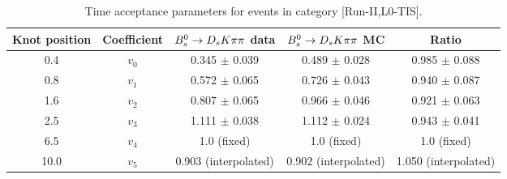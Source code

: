 \begin{table}[hp!]
\centering
\small
\caption{Time acceptance parameters for events in category [\textsf{Run-II},\textsf{L0-TIS}].}
\begin{tabular}{c c c c c}
\hline
\hline
Knot position & Coefficient & ${{B}^0_{s}}\rightarrow{\ensuremath{{D}_{s}}}{\ensuremath{K}}{\ensuremath{\pi}}{\ensuremath{\pi}}$ data & ${{B}^0_{s}}\rightarrow{\ensuremath{{D}_{s}}}{\ensuremath{K}}{\ensuremath{\pi}}{\ensuremath{\pi}}$ MC & Ratio \\
\hline
0.4 & $v_{0}$ & 0.345 $\pm$ 0.039 & 0.489 $\pm$ 0.028 & 0.985 $\pm$ 0.088\\
0.8 & $v_{1}$ & 0.572 $\pm$ 0.065 & 0.726 $\pm$ 0.043 & 0.940 $\pm$ 0.087\\
1.6 & $v_{2}$ & 0.807 $\pm$ 0.065 & 0.966 $\pm$ 0.046 & 0.921 $\pm$ 0.063\\
2.5 & $v_{3}$ & 1.111 $\pm$ 0.038 & 1.112 $\pm$ 0.024 & 0.943 $\pm$ 0.041\\
6.5 & $v_{4}$ &  1.0 (fixed) & 1.0 (fixed) & 1.0 (fixed)\\
10.0 & $v_{5}$ & 0.903 (interpolated) & 0.902 (interpolated) & 1.050 (interpolated) \\
\hline
\hline
\end{tabular}
\label{table:splines}
\end{table}